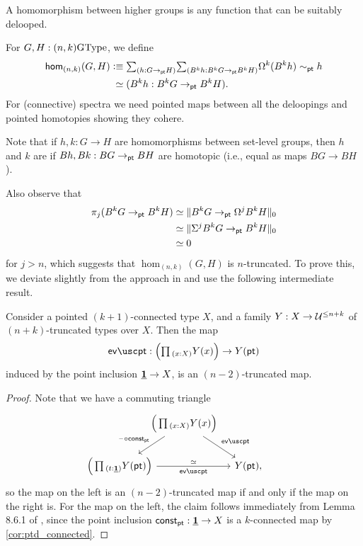 A homomorphism between higher groups is any
function that can be suitably delooped.

\begin{defn}
For $G,H : (n,k)\GType$, we define
\begin{align*}
\hom_{(n,k)}(G,H) & \defeq  
\sm{h: G \to_\pt H}{B^k h: B^kG \to_\pt B^kH} \loopspacesym^k(B^k h) \sim_\pt h \\
&\phantom{:}\eqvsym (B^k h: B^kG \to_\pt B^kH).
\end{align*}
For (connective) spectra we need
pointed maps between all the deloopings and pointed homotopies showing
they cohere.
\end{defn}

Note that if $h,k : G \to H$ are homomorphisms between set-level
groups, then $h$ and $k$ are  if $Bh, Bk : BG \to_\pt BH$ are
 homotopic (i.e., equal as maps $BG \to BH$).

Also observe that 
\begin{align*}
\pi_j(B^kG \to_\pt B^kH) & \eqvsym \trunc{0}{B^kG \to_\pt \loopspacesym^jB^kH} \\
& \eqvsym \trunc{0}{\Sigma^jB^kG \to_\pt B^kH} \\
& \eqvsym 0
\end{align*}
for $j>n$, which suggests that $\hom_{(n,k)}(G,H)$ is $n$-truncated. To prove this, we deviate slightly from the approach in \cite{BuchholtzDoornRijke} and use the following intermediate result.

\begin{prp}
Consider a pointed $(k+1)$-connected type $X$, and a family $Y:X\to\UU^{\le n+k}$ of $(n+k)$-truncated types over $X$. Then the map
\begin{equation*}
\evpt : \Big(\prd{x:X}Y(x)\Big) \to Y(\pt)
\end{equation*}
induced by the point inclusion $\unit\to X$, is an $(n-2)$-truncated map.
\end{prp}

\begin{proof}
Note that we have a commuting triangle
\begin{equation*}
\begin{tikzcd}[column sep=-1em]
& \Big(\prd{x:X}Y(x)\Big) \arrow[dl,swap,"\blank\circ \mathsf{const}_\pt"] \arrow[dr,"\evpt"] & \phantom{\Big(\prd{t:\unit} Y(\pt)\Big)} \\
\Big(\prd{t:\unit} Y(\pt)\Big) \arrow[rr,swap,"\evpt","\eqvsym"'] & & Y(\pt),
\end{tikzcd}
\end{equation*}
so the map on the left is an $(n-2)$-truncated map if and only if the map on the right is. For the map on the left, the claim follows immediately from Lemma 8.6.1 of \cite{hottbook}, since the point inclusion $\mathsf{const}_\pt:\unit\to X$ is a $k$-connected map by \cref{cor:ptd_connected}.
\end{proof}

